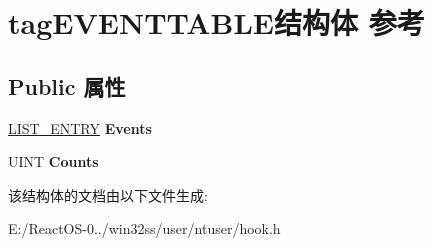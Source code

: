 \hypertarget{structtag_e_v_e_n_t_t_a_b_l_e}{}\section{tag\+E\+V\+E\+N\+T\+T\+A\+B\+L\+E结构体 参考}
\label{structtag_e_v_e_n_t_t_a_b_l_e}
\subsection*{Public 属性}
\begin{DoxyCompactItemize}
\item 
\mbox{\label{structtag_e_v_e_n_t_t_a_b_l_e_acfdf1e347f93732ed0ea5a74012c0013}} 
\hyperlink{struct___l_i_s_t___e_n_t_r_y}{L\+I\+S\+T\+\_\+\+E\+N\+T\+RY} {\bfseries Events}
\item 
\mbox{\label{structtag_e_v_e_n_t_t_a_b_l_e_a412e54e3a766d8609effa6f368c2e063}} 
U\+I\+NT {\bfseries Counts}
\end{DoxyCompactItemize}


该结构体的文档由以下文件生成\+:\begin{DoxyCompactItemize}
\item 
E\+:/\+React\+O\+S-\/0../win32ss/user/ntuser/hook.\+h\end{DoxyCompactItemize}
